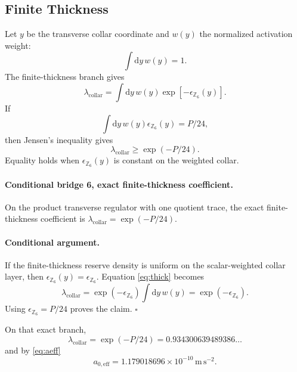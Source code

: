 \documentclass[11pt]{article}
\newcommand{\aeff}{a_{0,\mathrm{eff}}}
\newcommand{\lambdac}{\lambda_{\mathrm{collar}}}
\newcommand{\Zsix}{\mathbb Z_6}
\newcommand{\dd}{\mathrm{d}}
\begin{document}
\subsection{Finite Thickness}

Let \(y\) be the transverse collar coordinate and \(w(y)\) the normalized
activation weight:
\begin{equation}
  \int \dd y\,w(y)=1.
\end{equation}
The finite-thickness branch gives
\begin{equation}
  \lambdac
   =\int \dd y\, w(y)\exp[-\epsilon_{\Zsix}(y)].
  \label{eq:thick}
\end{equation}
If
\begin{equation}
  \int \dd y\,w(y)\epsilon_{\Zsix}(y)=P/24,
\end{equation}
then Jensen's inequality gives
\begin{equation}
  \lambdac \ge \exp(-P/24).
\end{equation}
Equality holds when \(\epsilon_{\Zsix}(y)\) is constant on the weighted
collar.

\paragraph{Conditional bridge 6, exact finite-thickness coefficient.}
On the product transverse regulator with one quotient trace, the exact
finite-thickness coefficient is \(\lambdac=\exp(-P/24)\).

\paragraph{Conditional argument.}
If the finite-thickness reserve density is uniform on the scalar-weighted
collar layer, then \(\epsilon_{\Zsix}(y)=\epsilon_{\Zsix}\).  Equation
\eqref{eq:thick}
becomes
\begin{equation}
  \lambdac
  =\exp(-\epsilon_{\Zsix})\int \dd y\,w(y)
  =\exp(-\epsilon_{\Zsix}).
\end{equation}
Using \(\epsilon_{\Zsix}=P/24\) proves the claim. \(\square\)

On that exact branch,
\begin{equation}
  \lambdac=\exp(-P/24)=0.934300639489386\ldots
  \label{eq:z6lambda}
\end{equation}
and by \eqref{eq:aeff}
\begin{equation}
  \aeff=1.179018696\times10^{-10}\,\mathrm{m\,s^{-2}}.
\end{equation}
\end{document}
